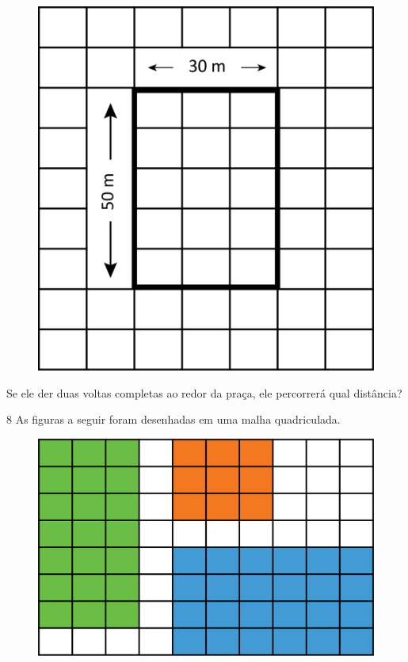\begin{figure}[htpb!]
\centering
\includegraphics[width=.8\textwidth]{./media/image55.png}
\end{figure}

Se ele der duas voltas completas ao redor da praça, ele percorrerá qual distância?


\pagebreak
\num{8} As figuras a seguir foram desenhadas em uma malha quadriculada.


\begin{figure}[htpb!]
\includegraphics[width=\textwidth]{./media/image56.png}
\end{figure}

